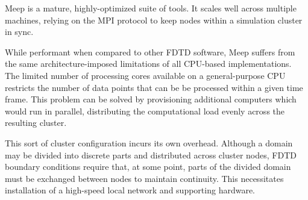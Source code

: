 Meep is a mature, highly-optimized suite of tools. It scales well across multiple machines, relying on the MPI protocol to keep nodes within a simulation cluster in sync. 

While performant when compared to other FDTD software, Meep suffers from the same architecture-imposed limitations of all CPU-based implementations. The limited number of processing cores available on a general-purpose CPU restricts the number of data points that can be be processed within a given time frame. This problem can be solved by provisioning additional computers which would run in parallel, distributing the computational load evenly across the resulting cluster.

This sort of cluster configuration incurs its own overhead. Although a domain may be divided into discrete parts and distributed across cluster nodes, FDTD boundary conditions require that, at some point, parts of the divided domain must be exchanged between nodes to maintain continuity. This necessitates installation of a high-speed local network and supporting hardware. 





